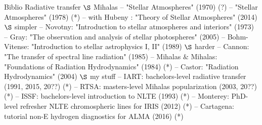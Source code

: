 \begin{frame}{Biblio Radiative transfer}
$\S$ Mihalas
– "Stellar Atmospheres" (1970) (?)
– "Stellar Atmospheres" (1978) (*)
– with Hubeny : "Theory of Stellar Atmospheres" (2014)
$\S$ simpler
– Novotny: "Introduction to stellar atmospheres and interiors" (1973)
– Gray: "The observation and analysis of stellar photospheres" (2005) – Bohm-Vitense: "Introduction to stellar astrophysics I, II" (1989)
$\S$ harder
– Cannon: "The transfer of spectral line radiation" (1985)
– Mihalas $\&$ Mihalas: "Foundations of Radiation Hydrodynamics" (1984) (*) – Castor: "Radiation Hydrodynamics" (2004)
$\S$ my stuff
– IART: bachelors-level radiative transfer (1991, 2015, 20??) (*)
– RTSA: masters-level Mihalas popularization (2003, 20??) (*)
– ISSF: bachelors-level introduction to NLTE (1993) (*)
– Monterey: PhD-level refresher NLTE chromospheric lines for IRIS (2012) (*) – Cartagena: tutorial non-E hydrogen diagnostics for ALMA (2016) (*)
\end{frame}

